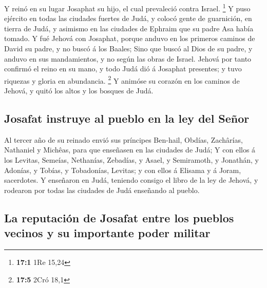  Y reinó en su lugar Josaphat su hijo, el cual prevaleció
contra Israel. \footnote{\textbf{17:1} 1Re 15,24}  Y puso
ejército en todas las ciudades fuertes de Judá, y colocó gente de
guarnición, en tierra de Judá, y asimismo en las ciudades de Ephraim que
su padre Asa había tomado.  Y fué Jehová con Josaphat,
porque anduvo en los primeros caminos de David su padre, y no buscó á
los Baales;  Sino que buscó al Dios de su padre, y anduvo en
sus mandamientos, y no según las obras de Israel.  Jehová
por tanto confirmó el reino en su mano, y todo Judá dió á Josaphat
presentes; y tuvo riquezas y gloria en abundancia. \footnote{\textbf{17:5}
  2Cró 18,1}  Y animóse su corazón en los caminos de Jehová,
y quitó los altos y los bosques de Judá.

\hypertarget{josafat-instruye-al-pueblo-en-la-ley-del-seuxf1or}{%
\subsection{Josafat instruye al pueblo en la ley del
Señor}\label{josafat-instruye-al-pueblo-en-la-ley-del-seuxf1or}}

 Al tercer año de su reinado envió sus príncipes Ben-hail,
Obdías, Zachârías, Nathaniel y Michêas, para que enseñasen en las
ciudades de Judá;  Y con ellos á los Levitas, Semeías,
Nethanías, Zebadías, y Asael, y Semiramoth, y Jonathán, y Adonías, y
Tobías, y Tobadonías, Levitas; y con ellos á Elisama y á Joram,
sacerdotes.  Y enseñaron en Judá, teniendo consigo el libro
de la ley de Jehová, y rodearon por todas las ciudades de Judá enseñando
al pueblo.

\hypertarget{la-reputaciuxf3n-de-josafat-entre-los-pueblos-vecinos-y-su-importante-poder-militar}{%
\subsection{La reputación de Josafat entre los pueblos vecinos y su
importante poder
militar}\label{la-reputaciuxf3n-de-josafat-entre-los-pueblos-vecinos-y-su-importante-poder-militar}}


